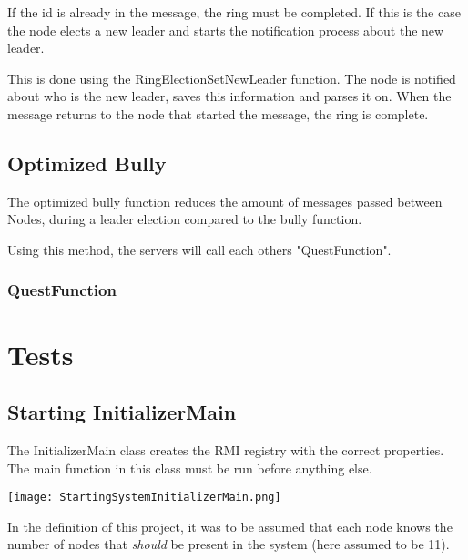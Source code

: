 If the id is already in the message, the ring must be completed. If this is the case the node elects a new leader and starts the notification process about the new leader.

This is done using the RingElectionSetNewLeader function. The node is notified about who is the new leader, saves this information and parses it on. When the message returns to the node that started the message, the ring is complete.

\begin{center}
\end{center}

\subsection{Optimized Bully}
The optimized bully function reduces the amount of messages passed between Nodes, during a leader election compared to the bully function.

Using this method, the servers will call each others "QuestFunction".

\subsubsection{QuestFunction}




\section{Tests}
\subsection{Starting InitializerMain}
The InitializerMain class creates the RMI registry with the correct properties. The main function in this class must be run before anything else. 

\begin{center}
	\texttt{[image: StartingSystemInitializerMain.png]}
\end{center}

In the definition of this project, it was to be assumed that each node knows the number of nodes that \textit{should} be present in the system (here assumed to be 11).

